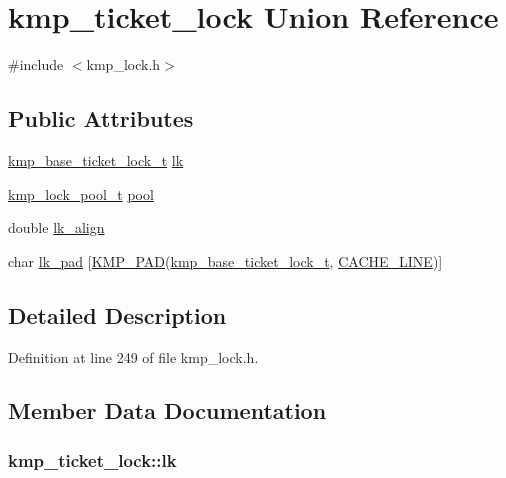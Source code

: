 \hypertarget{unionkmp__ticket__lock}{\section{kmp\-\_\-ticket\-\_\-lock Union Reference}
\label{unionkmp__ticket__lock}
}


{\ttfamily \#include $<$kmp\-\_\-lock.\-h$>$}

\subsection*{Public Attributes}
\begin{DoxyCompactItemize}
\item 
\hyperlink{kmp__lock_8h_af8dc62875c68083ff0b664d8f2b1075c}{kmp\-\_\-base\-\_\-ticket\-\_\-lock\-\_\-t} \hyperlink{unionkmp__ticket__lock_afc1a5e006715d07f36f2ddae6dc0b04b}{lk}
\item 
\hyperlink{kmp__lock_8h_a467f5477f4f5397ebd24a94c85922744}{kmp\-\_\-lock\-\_\-pool\-\_\-t} \hyperlink{unionkmp__ticket__lock_a54288856f4b927cd2da1c0aa5c702127}{pool}
\item 
double \hyperlink{unionkmp__ticket__lock_a76d2711b4f42f0a986efc2ec5d5e72a1}{lk\-\_\-align}
\item 
char \hyperlink{unionkmp__ticket__lock_a0d8018b3fe9bdf60216f3d3dc870cc5d}{lk\-\_\-pad} \mbox{[}\hyperlink{kmp__lock_8h_a7e782410115489f45ab1686c39a2bb89}{K\-M\-P\-\_\-\-P\-A\-D}(\hyperlink{kmp__lock_8h_af8dc62875c68083ff0b664d8f2b1075c}{kmp\-\_\-base\-\_\-ticket\-\_\-lock\-\_\-t}, \hyperlink{kmp__os_8h_a86194c659a2d795e5f5949d293ae4661}{C\-A\-C\-H\-E\-\_\-\-L\-I\-N\-E})\mbox{]}
\end{DoxyCompactItemize}


\subsection{Detailed Description}


Definition at line 249 of file kmp\-\_\-lock.\-h.



\subsection{Member Data Documentation}
\hypertarget{unionkmp__ticket__lock_afc1a5e006715d07f36f2ddae6dc0b04b}{
\subsubsection[{lk}]{ kmp\-\_\-ticket\-\_\-lock\-::lk}}\label{unionkmp__ticket__lock_afc1a5e006715d07f36f2ddae6dc0b04b}


